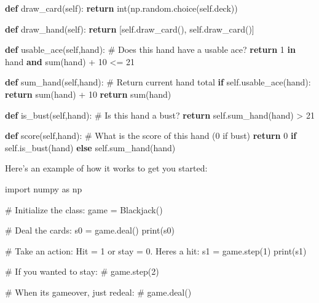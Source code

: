 \documentclass[
  letterpaper,
  DIV=11,
  numbers=noendperiod]{scrartcl}
\newenvironment{Shaded}{\begin{snugshade}}{\end{snugshade}}
\newcommand{\BuiltInTok}[1]{\textcolor[rgb]{0.00,0.23,0.31}{#1}}
\newcommand{\CommentTok}[1]{\textcolor[rgb]{0.37,0.37,0.37}{#1}}
\newcommand{\ControlFlowTok}[1]{\textcolor[rgb]{0.00,0.23,0.31}{\textbf{#1}}}
\newcommand{\DecValTok}[1]{\textcolor[rgb]{0.68,0.00,0.00}{#1}}
\newcommand{\ImportTok}[1]{\textcolor[rgb]{0.00,0.46,0.62}{#1}}
\newcommand{\KeywordTok}[1]{\textcolor[rgb]{0.00,0.23,0.31}{\textbf{#1}}}
\newcommand{\NormalTok}[1]{\textcolor[rgb]{0.00,0.23,0.31}{#1}}
\newcommand{\OperatorTok}[1]{\textcolor[rgb]{0.37,0.37,0.37}{#1}}
\newcommand{\VariableTok}[1]{\textcolor[rgb]{0.07,0.07,0.07}{#1}}
\begin{document}
\begin{Shaded}
\begin{Highlighting}[]
    \KeywordTok{def}\NormalTok{ draw\_card(}\VariableTok{self}\NormalTok{):}
        \ControlFlowTok{return} \BuiltInTok{int}\NormalTok{(np.random.choice(}\VariableTok{self}\NormalTok{.deck))}
    
    \KeywordTok{def}\NormalTok{ draw\_hand(}\VariableTok{self}\NormalTok{):}
        \ControlFlowTok{return}\NormalTok{ [}\VariableTok{self}\NormalTok{.draw\_card(), }\VariableTok{self}\NormalTok{.draw\_card()]}
    
    \KeywordTok{def}\NormalTok{ usable\_ace(}\VariableTok{self}\NormalTok{,hand):  }\CommentTok{\# Does this hand have a usable ace?}
        \ControlFlowTok{return} \DecValTok{1} \KeywordTok{in}\NormalTok{ hand }\KeywordTok{and} \BuiltInTok{sum}\NormalTok{(hand) }\OperatorTok{+} \DecValTok{10} \OperatorTok{\textless{}=} \DecValTok{21}
    
    \KeywordTok{def}\NormalTok{ sum\_hand(}\VariableTok{self}\NormalTok{,hand):  }\CommentTok{\# Return current hand total}
        \ControlFlowTok{if} \VariableTok{self}\NormalTok{.usable\_ace(hand):}
            \ControlFlowTok{return} \BuiltInTok{sum}\NormalTok{(hand) }\OperatorTok{+} \DecValTok{10}
        \ControlFlowTok{return} \BuiltInTok{sum}\NormalTok{(hand)}
    
    \KeywordTok{def}\NormalTok{ is\_bust(}\VariableTok{self}\NormalTok{,hand):  }\CommentTok{\# Is this hand a bust?}
        \ControlFlowTok{return} \VariableTok{self}\NormalTok{.sum\_hand(hand) }\OperatorTok{\textgreater{}} \DecValTok{21}
    
    \KeywordTok{def}\NormalTok{ score(}\VariableTok{self}\NormalTok{,hand):  }\CommentTok{\# What is the score of this hand (0 if bust)}
        \ControlFlowTok{return} \DecValTok{0} \ControlFlowTok{if} \VariableTok{self}\NormalTok{.is\_bust(hand) }\ControlFlowTok{else} \VariableTok{self}\NormalTok{.sum\_hand(hand)}
\end{Highlighting}
\end{Shaded}

Here's an example of how it works to get you started:

\begin{Shaded}
\begin{Highlighting}[]
\ImportTok{import}\NormalTok{ numpy }\ImportTok{as}\NormalTok{ np}

\CommentTok{\# Initialize the class:}
\NormalTok{game }\OperatorTok{=}\NormalTok{ Blackjack()}

\CommentTok{\# Deal the cards:}
\NormalTok{s0 }\OperatorTok{=}\NormalTok{ game.deal()}
\BuiltInTok{print}\NormalTok{(s0)}

\CommentTok{\# Take an action: Hit = 1 or stay = 0. Here\textquotesingle{}s a hit:}
\NormalTok{s1 }\OperatorTok{=}\NormalTok{ game.step(}\DecValTok{1}\NormalTok{)}
\BuiltInTok{print}\NormalTok{(s1)}

\CommentTok{\# If you wanted to stay:}
\CommentTok{\# game.step(2)}

\CommentTok{\# When it\textquotesingle{}s gameover, just redeal:}
\CommentTok{\# game.deal()}
\end{Highlighting}
\end{Shaded}
\end{document}
